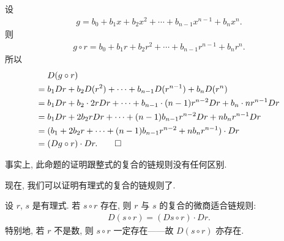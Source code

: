 \begin{pf}
    设
    \begin{align*}
        g = b_0 + b_1 x + b_2 x^2 + \cdots + b_{n-1} x^{n-1} + b_n x^n.
    \end{align*}
    则
    \begin{align*}
        g \circ r = b_0 + b_1 r + b_2 r^2 + \cdots + b_{n-1} r^{n-1} + b_n r^n.
    \end{align*}
    所以
    \begin{align*}
             & D(g \circ r)                                                                             \\
        = {} & b_1 Dr + b_2 D(r^2) + \cdots + b_{n-1} D(r^{n-1}) + b_n D(r^n)                           \\
        = {} & b_1 Dr + b_2 \cdot 2rDr + \cdots + b_{n-1} \cdot (n-1)r^{n-2} Dr + b_n \cdot nr^{n-1} Dr \\
        = {} & b_1 Dr + 2b_2 r Dr + \cdots + (n-1)b_{n-1} r^{n-2} Dr + nb_n r^{n-1} Dr                  \\
        = {} & (b_1 + 2b_2 r + \cdots + (n-1)b_{n-1} r^{n-2} + nb_n r^{n-1}) \cdot Dr                   \\
        = {} & (Dg \circ r) \cdot Dr. \qedhere
    \end{align*}
\end{pf}

\begin{remark}
    事实上, 此命题的证明跟整式的复合的链规则没有任何区别.
\end{remark}

现在, 我们可以证明有理式的复合的链规则了.

\begin{proposition}
    设 $r$, $s$ 是有理式. 若 $s \circ r$ 存在, 则 $r$ 与 $s$ 的复合的微商适合链规则:
    \begin{align*}
        D(s \circ r) = (Ds \circ r) \cdot Dr.
    \end{align*}
    特别地, 若 $r$ 不是数, 则 $s \circ r$ 一定存在——故 $D(s \circ r)$ 亦存在.
\end{proposition}


